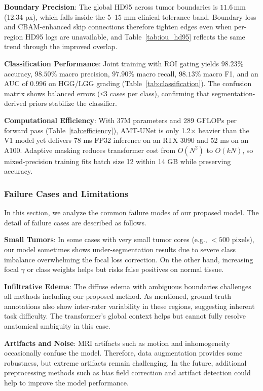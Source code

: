 \documentclass[runningheads]{llncs}
\begin{document}
\textbf{Boundary Precision}: The global HD95 across tumor boundaries is \(11.6\,\text{mm}\) (12.34 px), which falls inside the 5--15 mm clinical tolerance band. Boundary loss and CBAM-enhanced skip connections therefore tighten edges even when per-region HD95 logs are unavailable, and Table~\ref{tab:iou_hd95} reflects the same trend through the improved overlap.

\textbf{Classification Performance}: Joint training with ROI gating yields \(98.23\%\) accuracy, \(98.50\%\) macro precision, \(97.90\%\) macro recall, \(98.13\%\) macro F1, and an AUC of 0.996 on HGG/LGG grading (Table~\ref{tab:classification}). The confusion matrix shows balanced errors (≤3 cases per class), confirming that segmentation-derived priors stabilize the classifier.

\textbf{Computational Efficiency}: With 37M parameters and 289 GFLOPs per forward pass (Table~\ref{tab:efficiency}), AMT-UNet is only 1.2× heavier than the V1 model yet delivers 78 ms FP32 inference on an RTX 3090 and 52 ms on an A100. Adaptive masking reduces transformer cost from \(O(N^2)\) to \(O(kN)\), so mixed-precision training fits batch size 12 within 14 GB while preserving accuracy.

\subsubsection{Failure Cases and Limitations}

In this section, we analyze the common failure modes of our proposed model. The detail of failure cases are described as follows.

\textbf{Small Tumors}: In some cases with very small tumor cores (e.g., $<500$ pixels), our model sometimes shows under-segmentation results due to severe class imbalance overwhelming the focal loss correction. On the other hand, increasing focal $\gamma$ or class weights helps but risks false positives on normal tissue.

\textbf{Infiltrative Edema}: The diffuse edema with ambiguous boundaries challenges all methods including our proposed method. As mentioned, ground truth annotations also show inter-rater variability in these regions, suggesting inherent task difficulty. The transformer's global context helps but cannot fully resolve anatomical ambiguity in this case.

\textbf{Artifacts and Noise}: MRI artifacts such as motion and inhomogeneity occasionally confuse the model. Therefore, data augmentation provides some robustness, but extreme artifacts remain challenging. In the future, additional preprocessing methods such as bias field correction and artifact detection could help to improve the model performance.
\end{document}
